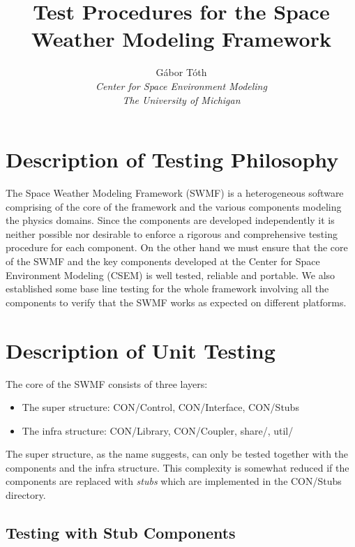 \documentclass[twoside,10pt]{report}
\title{Test Procedures for the Space Weather Modeling Framework}
\author{G\'abor T\'oth\\
  {\it Center for Space Environment Modeling}\\
  {\it The University of Michigan}}
\begin{document}
\pagestyle{fancy}
\lhead[\fancyplain{}{\bfseries\thepage}]{\fancyplain{}{\bfseries\rightmark}}
\rhead[\fancyplain{}{\bfseries\leftmark}]{\fancyplain{}{\bfseries\thepage}}
\cfoot{}

\maketitle

\tableofcontents

\chapter{Description of Testing Philosophy}

The Space Weather Modeling Framework (SWMF) is a heterogeneous software
comprising of the core of the framework and the various components
modeling the physics domains. Since the components are developed 
independently it is neither possible nor desirable to enforce a
rigorous and comprehensive testing procedure for each component.
On the other hand we must ensure that the core of the SWMF and
the key components developed at the Center for Space Environment
Modeling (CSEM) is well tested, reliable and portable. 
We also established some base line testing for the whole
framework involving all the components to verify that the SWMF
works as expected on different platforms.

\chapter{Description of Unit Testing}

The core of the SWMF consists of three layers:
\begin{itemize}
\item The super structure:  CON/Control, CON/Interface, CON/Stubs
\item The infra structure: CON/Library, CON/Coupler, share/, util/
\end{itemize}
The super structure, as the name suggests, can only be tested
together with the components and the infra structure. 
This complexity is somewhat reduced if the components are replaced
with {\it stubs} which are implemented in the CON/Stubs directory.

\section{Testing with Stub Components}
\end{document}
